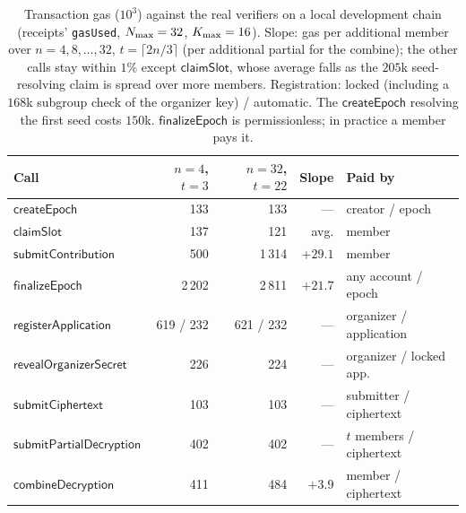 \begin{table}[t]
\centering
\caption{Transaction gas ($10^3$) against the real verifiers on a local development chain (receipts' \texttt{gasUsed}, $N_{\max} = 32$, $K_{\max} = 16$). Slope: gas per additional member over $n = 4, 8, \dots, 32$, $t = \lceil 2n/3\rceil$ (per additional partial for the combine); the other calls stay within $1\%$ except $\mathsf{claimSlot}$, whose average falls as the $205$k seed-resolving claim is spread over more members. Registration: locked (including a $168$k subgroup check of the organizer key) / automatic. The $\mathsf{createEpoch}$ resolving the first seed costs $150$k. $\mathsf{finalizeEpoch}$ is permissionless; in practice a member pays it.}
\label{tab:gas}
\footnotesize
\renewcommand{\arraystretch}{1.1}
\setlength{\tabcolsep}{3pt}
\begin{tabular}{lrrrl}
\hline
Call & $n{=}4$, $t{=}3$ & $n{=}32$, $t{=}22$ & Slope & Paid by \\
\hline
$\mathsf{createEpoch}$ & 133 & 133 & --- & creator / epoch \\
$\mathsf{claimSlot}$ & 137 & 121 & avg. & member \\
$\mathsf{submitContribution}$ & 500 & 1\,314 & $+29.1$ & member \\
$\mathsf{finalizeEpoch}$ & 2\,202 & 2\,811 & $+21.7$ & any account / epoch \\
$\mathsf{registerApplication}$ & 619 / 232 & 621 / 232 & --- & organizer / application \\
$\mathsf{revealOrganizerSecret}$ & 226 & 224 & --- & organizer / locked app. \\
$\mathsf{submitCiphertext}$ & 103 & 103 & --- & submitter / ciphertext \\
$\mathsf{submitPartialDecryption}$ & 402 & 402 & --- & $t$ members / ciphertext \\
$\mathsf{combineDecryption}$ & 411 & 484 & $+3.9$ & member / ciphertext \\
\hline
\end{tabular}
\end{table}

